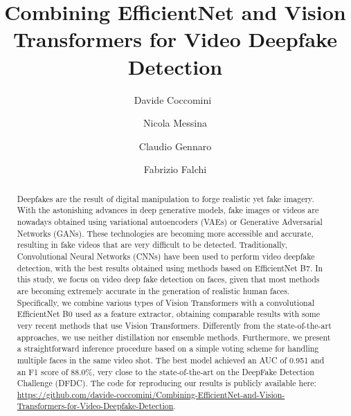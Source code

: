 \documentclass[runningheads]{llncs}
\begin{document}
\title{Combining EfficientNet and Vision Transformers for Video Deepfake Detection}
\author{Davide Coccomini\ \and
Nicola Messina \and
Claudio Gennaro \and Fabrizio Falchi}


\maketitle              \begin{abstract}
	Deepfakes are the result of digital manipulation to forge realistic yet fake imagery. With the astonishing advances in deep generative models, fake images or videos are nowadays obtained using variational autoencoders (VAEs) or Generative Adversarial Networks (GANs). These technologies are becoming more accessible and accurate, resulting in fake videos that are very difficult to be detected. Traditionally, Convolutional Neural Networks (CNNs) have been used to perform video deepfake detection, with the best results obtained using methods based on EfficientNet B7. In this study, we focus on video deep fake detection on faces, given that most methods are becoming extremely accurate in the generation of realistic human faces. Specifically, we combine various types of Vision Transformers with a convolutional EfficientNet B0 used as a feature extractor, obtaining comparable results with some very recent methods that use Vision Transformers. Differently from the state-of-the-art approaches, we use neither distillation nor ensemble methods. Furthermore, we present a straightforward inference procedure based on a simple voting scheme for handling multiple faces in the same video shot. The best model achieved an AUC of 0.951 and an F1 score of 88.0\%, very close to the state-of-the-art on the DeepFake Detection Challenge (DFDC). The code for reproducing our results is publicly available here: \url{https://github.com/davide-coccomini/Combining-EfficientNet-and-Vision-Transformers-for-Video-Deepfake-Detection}.
\end{abstract}


\end{document}
